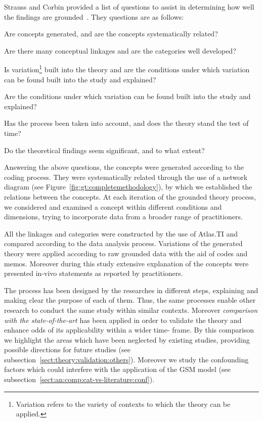 \documentclass[10pt,journal,letterpaper,compsoc]{IEEEtran}
\begin{document}
Strauss and Corbin provided a list of questions to assist in determining how
well the findings are grounded~\cite{Strauss1998}. They questions are as
follows:

\par\vspace {0.4cm} 
\begin{compactenum} 
\item Are concepts generated, and are the concepts systematically related? 
\item Are there many conceptual linkages and are the categories well developed? 
\item Is variation\footnote{Variation refers to the variety of contexts to 
which the theory can be applied.} built into the theory and are the conditions 
under which variation can be found built into the study and explained? 
\item Are the conditions under which variation can be found built into the 
study and explained? 
\item Has the process been taken into account, and does the theory stand the 
test of time? 
\item Do the theoretical findings seem significant, and to what extent? 
\end{compactenum}
\par\vspace {0.4cm}

Answering the above questions, the concepts were generated according to the
coding process. They were systematically related through the use of a network
diagram (see Figure~\ref{fig:gt:completemethodology}), by which we established
the relations between the concepts. At each iteration of the grounded theory
process, we considered and examined a concept within different conditions and
dimensions, trying to incorporate data from a broader range of practitioners.

All the linkages and categories were constructed by the use of Atlas.TI and
compared according to the data analysis process. Variations of the generated
theory were applied according to raw grounded data with the aid of codes and
memos. Moreover during this study extensive explanation of the concepts were
presented in-vivo statements as reported by practitioners.

The process has been designed by the researches in different steps, explaining
and making clear the purpose of each of them. Thus, the same processes enable
other research to conduct the same study within similar contexts. Moreover
\textit{comparison with the state-of-the-art} has been applied in order to
validate the theory and enhance odds of its applicability within a wider time-
frame. By this comparison we highlight the areas which have been neglected by
existing studies, providing possible directions for future studies (see
subsection~\ref{sect:theory:validation:others}). Moreover we study the
confounding factors which could interfere with the application of the GSM model
(see subsection~\ref{sect:an:comp:cat-vs-literature:conf}).
\end{document}
